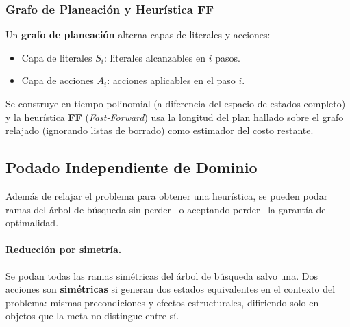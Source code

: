 \subsubsection{Grafo de Planeación y Heurística FF}

Un \textbf{grafo de planeación} alterna capas de literales y acciones:
\begin{itemize}
    \item Capa de literales $S_i$: literales alcanzables en $i$ pasos.
    \item Capa de acciones $A_i$: acciones aplicables en el paso $i$.
\end{itemize}
Se construye en tiempo polinomial (a diferencia del espacio de estados completo) y la heurística
\textbf{FF} (\textit{Fast-Forward}) usa la longitud del plan hallado sobre el grafo relajado
(ignorando listas de borrado) como estimador del costo restante.

\subsection{Podado Independiente de Dominio}

Además de relajar el problema para obtener una heurística, se pueden podar ramas del árbol de
búsqueda sin perder --o aceptando perder-- la garantía de optimalidad.

\paragraph{Reducción por simetría.} Se podan todas las ramas simétricas del árbol de búsqueda salvo
una. Dos acciones son \textbf{simétricas} si generan dos estados equivalentes en el contexto del
problema: mismas precondiciones y efectos estructurales, difiriendo solo en objetos que la meta no
distingue entre sí.

